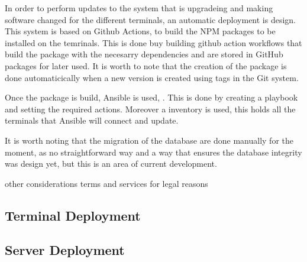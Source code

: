 In order to perform updates to the system that is upgradeing and making software changed for the different terminals, an automatic deployment is design. This system is based on Github Actions, to build the NPM packages to be installed on the temrinals. This is done buy building github action workflows that build the package with the necesarry dependencies and are stored in GitHub packages for later used. It is worth to note that the creation of the package is done automaticically when a new version is created using tags in the Git system.

Once the package is build, Ansible is used, . This is done by creating a playbook and setting the required actions. Moreover a inventory is used, this holds all the terminals that Ansible will  connect and update.


It is worth noting that the migration of the database are done manually for the moment, as no straightforward way and a way that ensures the database integrity was design yet, but this is an area of current development.



other considerations
terms and services for legal reasons

\subsection{Terminal Deployment}

\subsection{Server Deployment}


